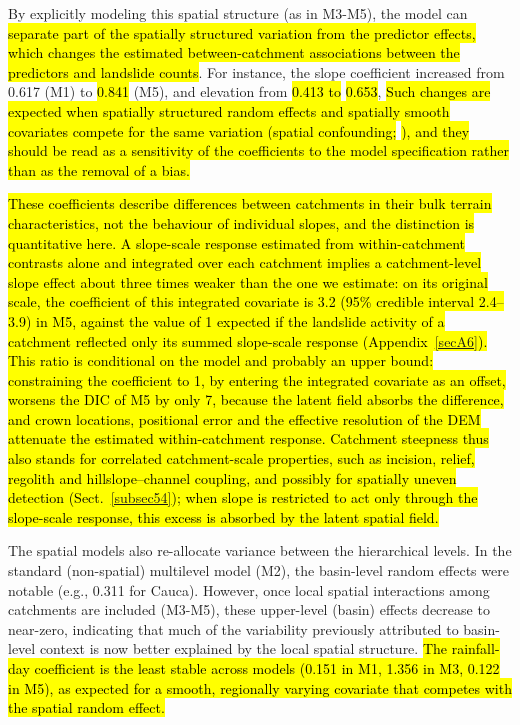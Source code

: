 \documentclass[journal abbreviation, manuscript]{copernicus}
\newcommand{\hlE}[1]{{\sethlcolor{edcyan}\hl{#1}}}
\begin{document}
By explicitly modeling this spatial structure (as in M3-M5), the model can \hlE{separate part of the spatially structured variation from the predictor effects, which changes the estimated between-catchment associations between the predictors and landslide counts}. 
For instance, the slope coefficient increased from 0.617 (M1) to \hlE{0.841} (M5), and elevation from \hl{0.413 to} \hlE{0.653}, \hlE{Such changes are expected when spatially structured random effects and spatially smooth covariates compete for the same variation (spatial confounding; }\citealp{hodges2010adding}\hlE{), and they should be read as a sensitivity of the coefficients to the model specification rather than as the removal of a bias.}

\hlE{These coefficients describe differences between catchments in their bulk terrain characteristics, not the behaviour of individual slopes, and the distinction is quantitative here. A slope-scale response estimated from within-catchment contrasts alone and integrated over each catchment implies a catchment-level slope effect about three times weaker than the one we estimate: on its original scale, the coefficient of this integrated covariate is 3.2 (95\% credible interval 2.4--3.9) in M5, against the value of 1 expected if the landslide activity of a catchment reflected only its summed slope-scale response (\mbox{Appendix~\ref{secA6}}). This ratio is conditional on the model and probably an upper bound: constraining the coefficient to 1, by entering the integrated covariate as an offset, worsens the DIC of M5 by only 7, because the latent field absorbs the difference, and crown locations, positional error and the effective resolution of the DEM attenuate the estimated within-catchment response. Catchment steepness thus also stands for correlated catchment-scale properties, such as incision, relief, regolith and hillslope--channel coupling, and possibly for spatially uneven detection (\mbox{Sect.~\ref{subsec54}}); when slope is restricted to act only through the slope-scale response, this excess is absorbed by the latent spatial field.}

The spatial models also re-allocate variance between the hierarchical levels. 
In the standard (non-spatial) multilevel model (M2), the basin-level random effects were notable (e.g., 0.311 for Cauca). 
However, once local spatial interactions among catchments are included (M3-M5), these upper-level (basin) effects decrease to near-zero, indicating that much of the variability previously attributed to basin-level context is now better explained by the local spatial structure. 
\hlE{The rainfall-day coefficient is the least stable across models (0.151 in M1, 1.356 in M3, 0.122 in M5), as expected for a smooth, regionally varying covariate that competes with the spatial random effect.}
\end{document}
